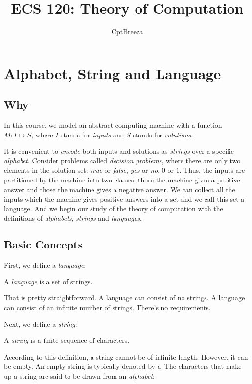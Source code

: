 \documentclass[11pt]{article}
\title{ECS 120: Theory of Computation}
\author{CptBreeza}
\begin{document}
\maketitle

\section{Alphabet, String and Language}

\subsection{Why}

In this course, we model an abstract computing machine with a function
$M : I \mapsto S$, where $I$ stands for \emph{inputs} and $S$ stands for
\emph{solutions}.

It is convenient to \emph{encode} both inputs and solutions as \emph{strings} over
a specific \emph{alphabet}. Consider problems called \emph{decision problems},
where there are only two elements in the solution set: \emph{true} or
\emph{false}, \emph{yes} or \emph{no}, $0$ or $1$. Thus, the inputs are
partitioned by the machine into two classes: those the machine gives a positive answer and those the machine gives a negative answer. We can collect all the
inputs which the machine gives positive answers into a set and we call this set a
language. And we begin our study of the theory of computation with the
definitions of \emph{alphabets}, \emph{strings} and \emph{languages}.

\subsection{Basic Concepts}

First, we define a \emph{language}:

\begin{definition}
A \emph{language} is a set of strings.
\end{definition}

That is pretty straightforward. A language can consist of no strings. A language can consist of an infinite number of strings. There's no requirements.

Next, we define a \emph{string}:
\begin{definition}
A \emph{string} is a finite sequence of characters.
\end{definition}

According to this definition, a string cannot be of infinite length. However, it can be empty. An empty string is typically denoted by $\epsilon$. The characters that make up a string are said to be drawn from an \emph{alphabet}:
\end{document}
